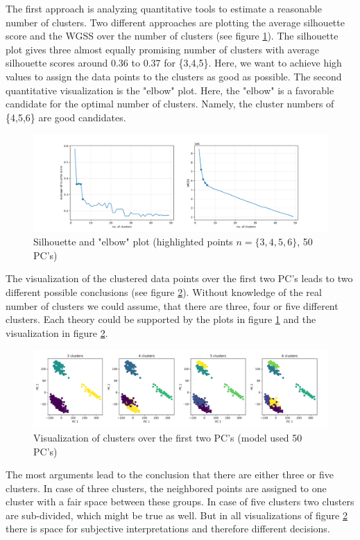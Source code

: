 The first approach is analyzing quantitative tools to estimate a reasonable number of clusters. Two different approaches are plotting the average silhouette score and the WGSS over the number of clusters (see figure \ref{fig:no_of_clusters}). The silhouette plot gives three almost equally promising number of clusters with average silhouette scores around 0.36 to 0.37 for \{3,4,5\}. Here, we want to achieve high values to assign the data points to the clusters as good as possible. The second quantitative visualization is the "elbow" plot. Here, the "elbow" is a favorable candidate for the optimal number of clusters. Namely, the cluster numbers of \{4,5,6\} are good candidates.\\

\begin{figure}[h]
	\centering
	\includegraphics[width=1.0\linewidth]{problem_03/no_of_clusters}
	\caption{Silhouette and "elbow" plot (highlighted points $n=\{3,4,5,6\}$, 50 PC's)}
	\label{fig:no_of_clusters}
\end{figure}

The visualization of the clustered data points over the first two PC's leads to two different possible conclusions (see figure \ref{fig:no_of_clusters_visualization}). Without knowledge of the real number of clusters we could assume, that there are three, four or five different clusters. Each theory could be supported by the plots in figure \ref{fig:no_of_clusters} and the visualization in figure \ref{fig:no_of_clusters_visualization}.\\

\begin{figure}[h]
	\centering
	\includegraphics[width=1.0\linewidth]{problem_03/no_of_clusters_visualization}
	\caption{Visualization of clusters over the first two PC's (model used 50 PC's)}
	\label{fig:no_of_clusters_visualization}
\end{figure}

The most arguments lead to the conclusion that there are either three or five clusters. In case of three clusters, the neighbored points are assigned to one cluster with a fair space between these groups. In case of five clusters two clusters are sub-divided, which might be true as well. But in all visualizations of figure \ref{fig:no_of_clusters_visualization} there is space for subjective interpretations and therefore different decisions.\\